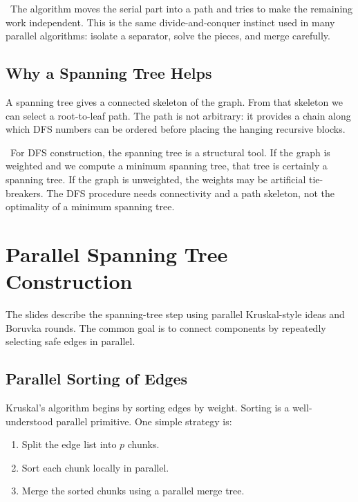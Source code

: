 \begin{ppkey}
\ The algorithm moves the serial part into a path and tries to make the remaining work independent.
This is the same divide-and-conquer instinct used in many parallel algorithms: isolate a separator, solve the pieces, and merge carefully.
\end{ppkey}

\subsection{Why a Spanning Tree Helps}

A spanning tree gives a connected skeleton of the graph.
From that skeleton we can select a root-to-leaf path.
The path is not arbitrary: it provides a chain along which DFS numbers can be ordered before placing the hanging recursive blocks.

\begin{ppnote}
\ For DFS construction, the spanning tree is a structural tool.
If the graph is weighted and we compute a minimum spanning tree, that tree is certainly a spanning tree.
If the graph is unweighted, the weights may be artificial tie-breakers.
The DFS procedure needs connectivity and a path skeleton, not the optimality of a minimum spanning tree.
\end{ppnote}

\section{Parallel Spanning Tree Construction}
\label{sec:parallel-kruskal}

The slides describe the spanning-tree step using parallel Kruskal-style ideas and Boruvka rounds.
The common goal is to connect components by repeatedly selecting safe edges in parallel.

\subsection{Parallel Sorting of Edges}

Kruskal's algorithm begins by sorting edges by weight.
Sorting is a well-understood parallel primitive.
One simple strategy is:

\begin{enumerate}
    \item Split the edge list into \(p\) chunks.
    \item Sort each chunk locally in parallel.
    \item Merge the sorted chunks using a parallel merge tree.
\end{enumerate}

